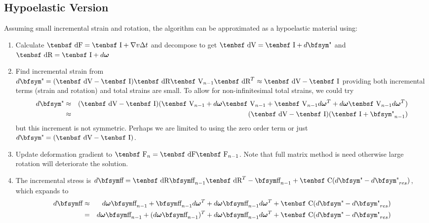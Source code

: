 \documentclass[11pt]{book}
\renewcommand{\vec}[1]{\boldsymbol{#1}}
\def\C{\hbox{\tenbsf C}}
\def\F{\hbox{\tenbsf F}}
\def\dF{\hbox{\tenbsf dF}}
\def\I{\hbox{\tenbsf I}}
\def\dR{\hbox{\tenbsf dR}}
\def\V{\hbox{\tenbsf V}}
\def\dV{\hbox{\tenbsf dV}}
\def\st{{\hbox{\bfsym\char'033}}}
\def\et{{\hbox{\bfsym\char'042}}}
\begin{document}
\subsection{Hypoelastic Version}

Assuming small incremental strain and rotation, the algorithm can be approximated as a hypoelastic material using:

\begin{enumerate}
\item Calculate $\dF = \I + \nabla v \Delta t$ and decompose to get $\dV=\I+d\et$ and $\dR=\I + d\vec\omega$
\item Find incremental strain from $d\et=(\dV-\I) \dR \V_{n-1} \dR^T \approx \dV-\I$ providing both incremental terms (strain and rotation) and total strains are small. To allow for non-infinitesimal total strains, we could try
\begin{eqnarray}
    d\et  & \approx & (\dV-\I) (\V_{n-1}+ d\vec\omega\V_{n-1} + \V_{n-1}d\vec\omega^T+d\vec\omega\V_{n-1}d\vec\omega^T) \\
    & \approx & (\dV-\I) (\I+\et_{n-1}) 
\end{eqnarray}
but this increment is not symmetric. Perhaps we are limited to using the zero order term or just $d\et = (\dV-\I)$.
\item Update deformation gradient to $\F_n =  \dF\F_{n-1}$. Note that full matrix method is need otherwise large rotation will deteriorate the solution.
\item The incremental stress is $d\st =  \dR \st_{n-1} \dR^T  - \st_{n-1}+  \C(d\et - d\et_{res})$, which expands to
\begin{eqnarray}
    d\st & \approx & d\vec\omega\st_{n-1} + \st_{n-1} d\vec\omega^T +  d\vec\omega\st_{n-1}d\vec\omega^T + \C(d\et - d\et_{res}) \\
      & = & d\vec\omega\st_{n-1} + (d\vec\omega\st_{n-1})^T + d\vec\omega\st_{n-1}d\vec\omega^T+ \C(d\et - d\et_{res})
\end{eqnarray}
\end{enumerate}
\end{document}
